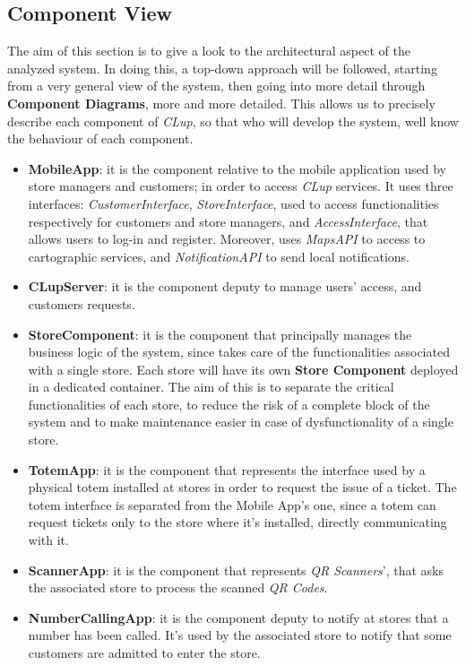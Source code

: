 \documentclass{article}
\begin{document}
	
	\subsection{Component View}
		The aim of this section is to give a look to the architectural aspect of the analyzed system. In doing this, a top-down approach will be followed, starting from a very general view of the system, then going into more detail through {\bfseries Component Diagrams}, more and more detailed. This allows us to precisely describe each component of \emph{CLup}, so that who will develop the system, well know the behaviour of each component.\\
		
		\begin{itemize}
			\item {\bfseries MobileApp}: it is the component relative to the mobile application used by store managers and customers; in order to access \emph{CLup} services. It uses three interfaces: \emph{CustomerInterface}, \emph{StoreInterface}, used to access functionalities respectively for customers and store managers, and \emph{AccessInterface}, that allows users to log-in and register. Moreover, uses \emph{MapsAPI} to access to cartographic services, and \emph{NotificationAPI} to send local notifications.
			
			\item {\bfseries CLupServer}:  it is the component deputy to manage users’ access, and customers requests.
			
			\item {\bfseries StoreComponent}: it is the component that principally manages the business logic of the system, since takes care of the functionalities associated with a single store. Each store will have its own {\bfseries Store Component} deployed in a dedicated container. The aim of this is to separate the critical functionalities of each store, to reduce the risk of a complete block of the system and to make maintenance easier in case of dysfunctionality of a single store.
			
			\item {\bfseries TotemApp}: it is the component that represents the interface used by a physical totem installed at stores in order to request the issue of a ticket. The totem interface is separated from the Mobile App’s one, since a totem can request tickets only to the store where it’s installed, directly communicating with it.
			
			\item {\bfseries ScannerApp}: it is the component that represents \emph{QR Scanners}’, that asks the associated store to process the scanned \emph{QR Codes}.
			
			\item {\bfseries NumberCallingApp}: it is the component deputy to notify at stores that a number has been called. It’s used by the associated store to notify that some customers are admitted to enter the store.		
		\end{itemize}
	
\end{document}
